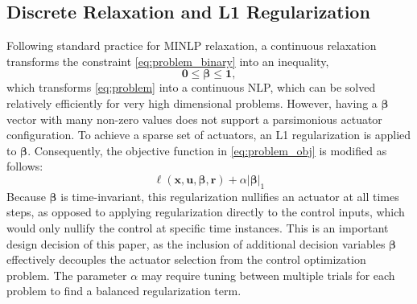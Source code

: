 \documentclass[runningheads]{llncs}
\begin{document}
\subsection{Discrete Relaxation and L1 Regularization}\label{sec:method:relaxation}
Following standard practice for MINLP relaxation, a continuous relaxation transforms the constraint \eqref{eq:problem_binary} into an inequality,
\begin{equation}
\textbf{0} \leq \boldsymbol{\beta} \leq \textbf{1},
\end{equation}
which transforms \eqref{eq:problem} into a continuous NLP, which can be solved relatively efficiently for very high dimensional problems. However, having a $\boldsymbol{\beta}$ vector with many non-zero values does not support a parsimonious actuator configuration. To achieve a sparse set of actuators, an L1 regularization is applied to $\boldsymbol{\beta}$. Consequently, the objective function in \eqref{eq:problem_obj} is modified as follows:
\begin{equation}
\ell(\textbf{x}, \textbf{u}, \boldsymbol{\beta} , \textbf{r}) + \alpha|\boldsymbol{\beta}|_1 \label{eq:obj_problem}
\end{equation}
Because $\boldsymbol{\beta}$ is time-invariant, this regularization nullifies an actuator at all times steps, as opposed to applying regularization directly to the control inputs, which would only nullify the control at specific time instances. This is an important design decision of this paper, as the inclusion of additional decision variables $\boldsymbol{\beta}$ effectively decouples the actuator selection from the control optimization problem. The parameter $\alpha$ may require tuning between multiple trials for each problem to find a balanced regularization term.
\end{document}
